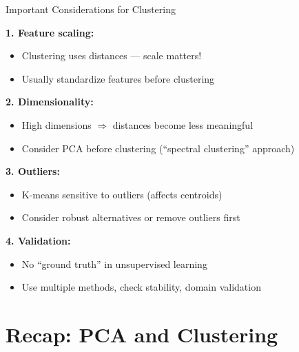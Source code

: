 \documentclass[10pt]{beamer}
\begin{document}
\begin{frame}{Important Considerations for Clustering}

  \textbf{1. Feature scaling:}
  \begin{itemize}
    \item Clustering uses distances --- scale matters!
    \item Usually standardize features before clustering
  \end{itemize}

  \vspace{0.5em}
  \textbf{2. Dimensionality:}
  \begin{itemize}
    \item High dimensions $\Rightarrow$ distances become less meaningful
    \item Consider PCA before clustering (``spectral clustering'' approach)
  \end{itemize}

  \vspace{0.5em}
  \textbf{3. Outliers:}
  \begin{itemize}
    \item K-means sensitive to outliers (affects centroids)
    \item Consider robust alternatives or remove outliers first
  \end{itemize}

  \vspace{0.5em}
  \textbf{4. Validation:}
  \begin{itemize}
    \item No ``ground truth'' in unsupervised learning
    \item Use multiple methods, check stability, domain validation
  \end{itemize}
\end{frame}

\section{Recap: PCA and Clustering}
\end{document}
